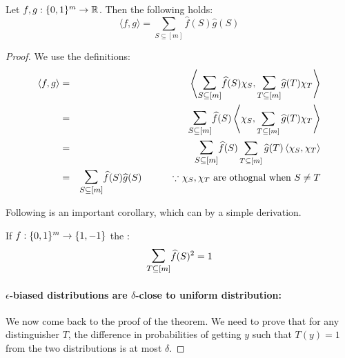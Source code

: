 \begin{theorem}
Let $f,g : \{0,1\}^m \to \mathbb{R}$. Then the following holds:
$$\langle f,g \rangle = \sum_{S \subseteq [m]} \widehat{f}(S) \hat{g}(S) $$
\end{theorem}
\begin{proof}
We use the definitions:
\begin{eqnarray*}
\langle f,g \rangle & = & \left\langle \bigsum_{S \subseteq [m]} \widehat{f}(S) \chi_S, \bigsum_{T \subseteq [m]} \widehat{g}(T)\chi_T \right\rangle \\
& = & \bigsum_{S \subseteq [m]}  \widehat{f}(S) \left\langle  \chi_S, \sum_{T \subseteq [m]} \widehat{g}(T)\chi_T \right\rangle \\
& = & \bigsum_{S \subseteq [m]}  \widehat{f}(S)   \sum_{T \subseteq [m]} \widehat{g}(T)\left\langle \chi_S, \chi_T \right\rangle \\
& = & \bigsum_{S \subseteq [m]}  \widehat{f}(S)  \widehat{g}(S) \textrm{  \hspace{1cm}$\because$ $\chi_S, \chi_T$ are othognal when $S \ne T$}
\end{eqnarray*}

Following is an important corollary, which can by a simple derivation.
\begin{corollary}
If $f : \{0,1\}^m \to \{1,-1\}$ the :
$$ \bigsum_{T \subseteq [m]} \widehat{f}(S)^2 = 1$$
\end{corollary}

\paragraph{\bf $\epsilon$-biased distributions are $\delta$-close to uniform distribution:} We now come back to the proof of the theorem. We need to prove that for any distinguisher $T$, the difference in probabilities of getting $y$ such that $T(y)=1$ from the two distributions is at most $\delta$.


\end{proof}
